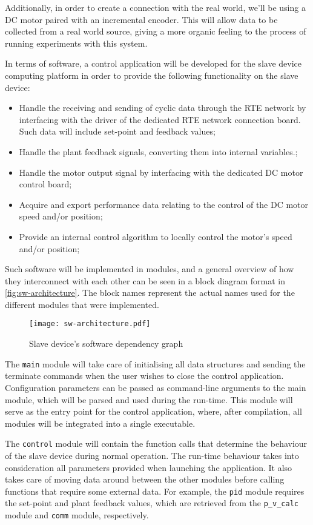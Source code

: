Additionally, in order to create a connection with the real world, we'll be using a DC motor paired with an incremental encoder.
This will allow data to be collected from a real world source, giving a more organic feeling to the process of running experiments with this system.

In terms of software, a control application will be developed for the slave device computing platform in order to provide the following functionality on the slave device:
\begin{itemize}
	\item Handle the receiving and sending of cyclic data through the RTE network by interfacing with the driver of the dedicated RTE network connection board. Such data will include set-point and feedback values;
	\item Handle the plant feedback signals, converting them into internal variables.;
	\item Handle the motor output signal by interfacing with the dedicated DC motor control board;
	\item Acquire and export performance data relating to the control of the DC motor speed and/or position;
	\item Provide an internal control algorithm to locally control the motor's speed and/or position;
\end{itemize}

Such software will be implemented in modules, and a general overview of how they interconnect with each other can be seen in a block diagram format in \autoref{fig:sw-architecture}.
The block names represent the actual names used for the different modules that were implemented.

\begin{figure}[htp]
	\centering
	\texttt{[image: sw-architecture.pdf]}
	\caption{Slave device's software dependency graph}
	\label{fig:sw-architecture}
\end{figure}

The \verb|main| module will take care of initialising all data structures and sending the terminate commands when the user wishes to close the control application.
Configuration parameters can be passed as command-line arguments to the main module, which will be parsed and used during the run-time.
This module will serve as the entry point for the control application, where, after compilation, all modules will be integrated into a single executable.

The \verb|control| module will contain the function calls that determine the behaviour of the slave device during normal operation.
The run-time behaviour takes into consideration all parameters provided when launching the application.
It also takes care of moving data around between the other modules before calling functions that require some external data.
For example, the \verb|pid| module requires the set-point and plant feedback values, which are retrieved from the \verb|p_v_calc| module and \verb|comm| module, respectively.

